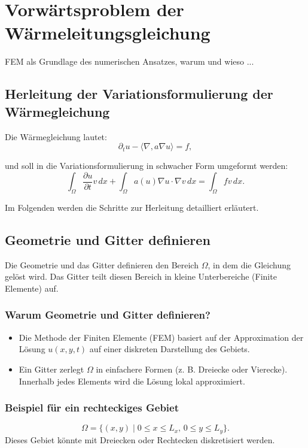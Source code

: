 \section{Vorwärtsproblem der Wärmeleitungsgleichung}

FEM als Grundlage des numerischen Ansatzes, warum und wieso ...

\subsection{Herleitung der Variationsformulierung der Wärmegleichung}

Die Wärmegleichung lautet:
\begin{equation}
	\partial_t u - \langle \nabla, a\nabla u \rangle  = f,
\end{equation}

und soll in die Variationsformulierung in schwacher Form umgeformt werden:
\begin{equation}
	\int_\Omega \frac{\partial u}{\partial t} v \, dx + \int_\Omega a(u) \nabla u \cdot \nabla v \, dx = \int_\Omega f v \, dx.
\end{equation}

Im Folgenden werden die Schritte zur Herleitung detailliert erläutert.

\subsection{Geometrie und Gitter definieren}
Die Geometrie und das Gitter definieren den Bereich $\Omega$, in dem die Gleichung gelöst wird. Das Gitter teilt diesen Bereich in kleine Unterbereiche (Finite Elemente) auf.

\subsubsection{Warum Geometrie und Gitter definieren?}
\begin{itemize}
	\item Die Methode der Finiten Elemente (FEM) basiert auf der Approximation der Lösung $u(x, y, t)$ auf einer diskreten Darstellung des Gebiets.
	\item Ein Gitter zerlegt $\Omega$ in einfachere Formen (z. B. Dreiecke oder Vierecke). Innerhalb jedes Elements wird die Lösung lokal approximiert.
\end{itemize}

\subsubsection{Beispiel für ein rechteckiges Gebiet}
\begin{equation}
	\Omega = \{(x, y) \mid 0 \leq x \leq L_x, \, 0 \leq y \leq L_y\}.
\end{equation}
Dieses Gebiet könnte mit Dreiecken oder Rechtecken diskretisiert werden.

